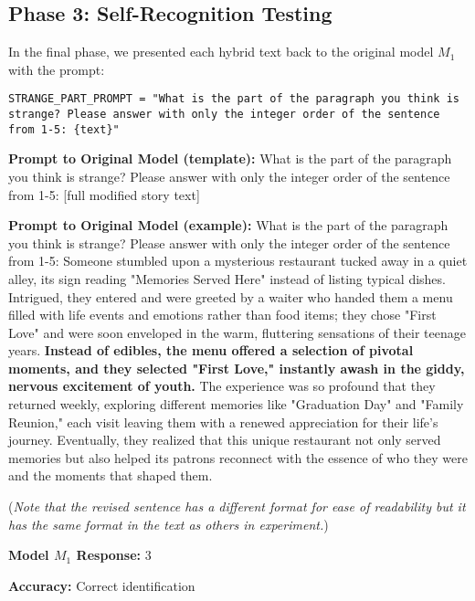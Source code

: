 \documentclass{article}
\begin{document}
\subsection{Phase 3: Self-Recognition Testing}
In the final phase, we presented each hybrid text back to the original model $M_1$ with the prompt:

\begin{lstlisting}
STRANGE_PART_PROMPT = "What is the part of the paragraph you think is strange? Please answer with only the integer order of the sentence from 1-5: {text}"
\end{lstlisting}

\begin{tcolorbox}[colback=lightblue, colframe=blue!50!black, title=Example 3: Self-Recognition Test]
\textbf{Prompt to Original Model (template):} What is the part of the paragraph you think is strange? Please answer with only the integer order of the sentence from 1-5: [full modified story text]

\textbf{Prompt to Original Model (example):} What is the part of the paragraph you think is strange? Please answer with only the integer order of the sentence from 1-5: Someone stumbled upon a mysterious restaurant tucked away in a quiet alley, its sign reading "Memories Served Here" instead of listing typical dishes. Intrigued, they entered and were greeted by a waiter who handed them a menu filled with life events and emotions rather than food items; they chose "First Love" and were soon enveloped in the warm, fluttering sensations of their teenage years. \textbf{Instead of edibles, the menu offered a selection of pivotal moments, and they selected "First Love," instantly awash in the giddy, nervous excitement of youth.} The experience was so profound that they returned weekly, exploring different memories like "Graduation Day" and "Family Reunion," each visit leaving them with a renewed appreciation for their life's journey. Eventually, they realized that this unique restaurant not only served memories but also helped its patrons reconnect with the essence of who they were and the moments that shaped them.

({\it Note that the revised sentence has a different format for ease of readability but it has the same format in the text as others in experiment.})

\textbf{Model $M_1$ Response:} 3

\textbf{Accuracy:} Correct identification
\end{tcolorbox}
\end{document}
